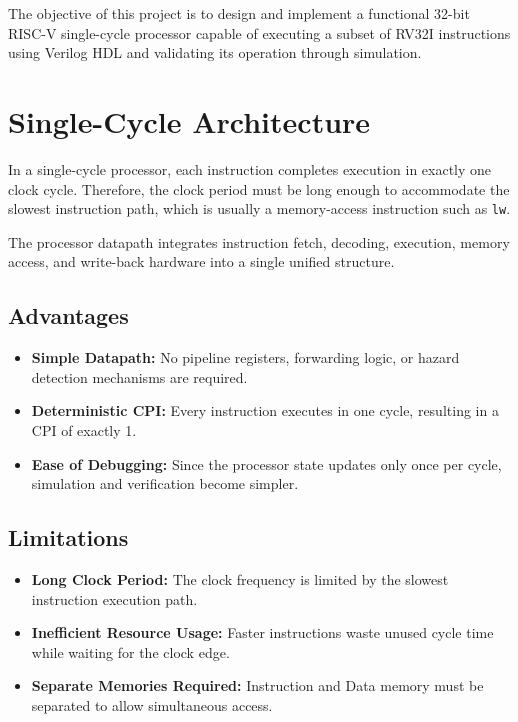 \documentclass[10pt,a4paper,twocolumn]{article}
\begin{document}
The objective of this project is to design and implement a functional 32-bit RISC-V single-cycle processor capable of executing a subset of RV32I instructions using Verilog HDL and validating its operation through simulation.

\section{Single-Cycle Architecture}

In a single-cycle processor, each instruction completes execution in exactly one clock cycle. Therefore, the clock period must be long enough to accommodate the slowest instruction path, which is usually a memory-access instruction such as \texttt{lw}.

The processor datapath integrates instruction fetch, decoding, execution, memory access, and write-back hardware into a single unified structure.

\subsection{Advantages}

\begin{itemize}
    \item \textbf{Simple Datapath:} No pipeline registers, forwarding logic, or hazard detection mechanisms are required.
    
    \item \textbf{Deterministic CPI:} Every instruction executes in one cycle, resulting in a CPI of exactly 1.
    
    \item \textbf{Ease of Debugging:} Since the processor state updates only once per cycle, simulation and verification become simpler.
\end{itemize}

\subsection{Limitations}

\begin{itemize}
    \item \textbf{Long Clock Period:} The clock frequency is limited by the slowest instruction execution path.
    
    \item \textbf{Inefficient Resource Usage:} Faster instructions waste unused cycle time while waiting for the clock edge.
    
    \item \textbf{Separate Memories Required:} Instruction and Data memory must be separated to allow simultaneous access.
\end{itemize}
\end{document}

